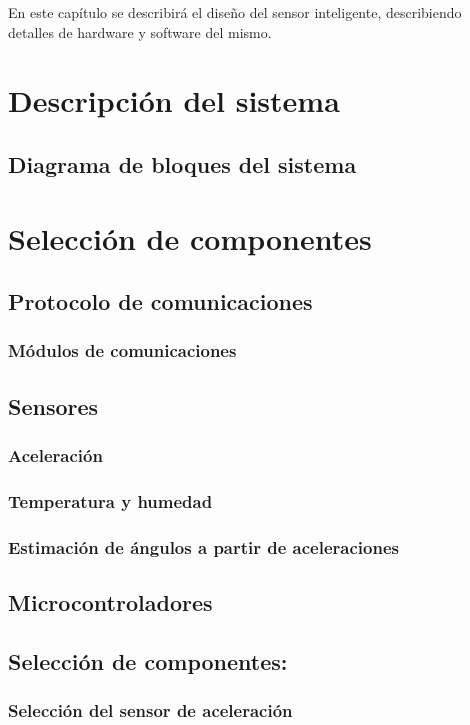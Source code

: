 En este capítulo se describirá el diseño del sensor inteligente, describiendo detalles de hardware y software del mismo.

\section{Descripción del sistema}

\subsection{Diagrama de bloques del sistema}

\section{Selección de componentes}

\subsection{Protocolo de comunicaciones}
\subsubsection{Módulos de comunicaciones}

\subsection{Sensores}
\subsubsection{Aceleración}
\subsubsection{Temperatura y humedad}
\subsubsection{Estimación de ángulos a partir de aceleraciones}

\subsection{Microcontroladores}

\subsection{Selección de componentes:}
\subsubsection{Selección del sensor de aceleración}
